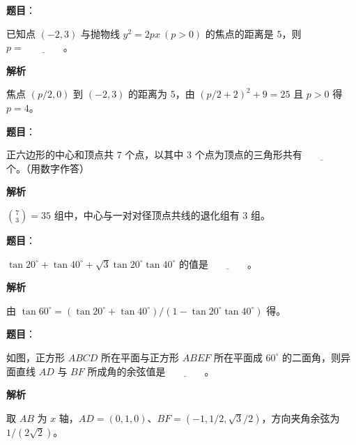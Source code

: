 \begin{answer}

\textbf{题目}：

已知点 $(-2,3)$ 与抛物线 $y^2=2px\ (p>0)$ 的焦点的距离是 $5$，则 $p=\underline{\qquad\qquad}$。

\textbf{解析}

焦点 $(p/2,0)$ 到 $(-2,3)$ 的距离为 $5$，由 $(p/2+2)^2+9=25$ 且 $p>0$ 得 $p=4$。


\end{answer}
\begin{answer}

\textbf{题目}：

正六边形的中心和顶点共 $7$ 个点，以其中 $3$ 个点为顶点的三角形共有$\underline{\qquad\qquad}$个。（用数字作答）

\textbf{解析}

$\binom73=35$ 组中，中心与一对对径顶点共线的退化组有 $3$ 组。


\end{answer}
\begin{answer}

\textbf{题目}：

$\tan20^\circ+\tan40^\circ+\sqrt{3}\tan20^\circ\tan40^\circ$ 的值是$\underline{\qquad\qquad}$。

\textbf{解析}

由 $\tan60^\circ=(\tan20^\circ+\tan40^\circ)/(1-\tan20^\circ\tan40^\circ)$ 得。


\end{answer}
\begin{answer}

\textbf{题目}：

如图，正方形 $ABCD$ 所在平面与正方形 $ABEF$ 所在平面成 $60^\circ$ 的二面角，则异面直线 $AD$ 与 $BF$ 所成角的余弦值是$\underline{\qquad\qquad}$。
\nopagebreak[4]
\begin{center}\end{center}
\nopagebreak[4]
\textbf{解析}

取 $AB$ 为 $x$ 轴，$AD=(0,1,0)$、$BF=(-1,1/2,\sqrt3/2)$，方向夹角余弦为 $1/(2\sqrt2)$。


\end{answer}
